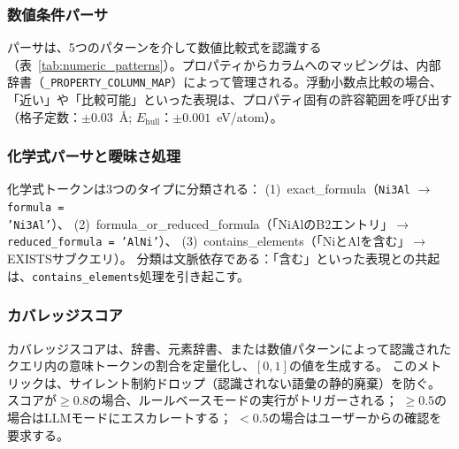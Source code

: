 \documentclass[twocolumn]{interact}
\makeatletter
\def\toprule{\noalign{\ifnum0=`}\fi
  \@aboverulesep=\abovetopsep
  \global\@belowrulesep=\belowrulesep
  \global\@thisruleclass=\@ne
  \@ifnextchar[{\@BTrule}{\@BTrule[\heavyrulewidth]}}
\def\midrule{\noalign{\ifnum0=`}\fi
  \@aboverulesep=\aboverulesep
  \global\@belowrulesep=\belowrulesep
  \global\@thisruleclass=\@ne
  \@ifnextchar[{\@BTrule}{\@BTrule[\lightrulewidth]}}
\def\bottomrule{\noalign{\ifnum0=`}\fi
  \@aboverulesep=\aboverulesep
  \global\@belowrulesep=\belowbottomsep
  \global\@thisruleclass=\@ne
  \@ifnextchar[{\@BTrule}{\@BTrule[\heavyrulewidth]}}
\makeatother
\begin{document}
\subsubsection{数値条件パーサ}

パーサは、5つのパターンを介して数値比較式を認識する（表~\ref{tab:numeric_patterns}）。プロパティからカラムへのマッピングは、内部辞書（\texttt{\_PROPERTY\_COLUMN\_MAP}）によって管理される。浮動小数点比較の場合、「近い」や「比較可能」といった表現は、プロパティ固有の許容範囲を呼び出す（格子定数：$\pm 0.03$~\AA{}{}; $E_\text{hull}$：$\pm 0.001$~eV/atom）。

\begin{table}[htbp]
  \centering
  \caption{数値条件パーサパターン。}
  \label{tab:numeric_patterns}
  \footnotesize
\end{table}

\subsubsection{化学式パーサと曖昧さ処理}

化学式トークンは3つのタイプに分類される：
(1)~exact\_formula（\texttt{Ni3Al} $\to$ \texttt{formula = 'Ni3Al'}）、
(2)~formula\_or\_reduced\_formula（「NiAlのB2エントリ」$\to$ \texttt{reduced\_formula = 'AlNi'}）、
(3)~contains\_elements（「NiとAlを含む」$\to$ EXISTSサブクエリ）。
分類は文脈依存である：「含む」といった表現との共起は、\texttt{contains\_elements}処理を引き起こす。

\subsubsection{カバレッジスコア}

カバレッジスコアは、辞書、元素辞書、または数値パターンによって認識されたクエリ内の意味トークンの割合を定量化し、$[0, 1]$の値を生成する。 このメトリックは、サイレント制約ドロップ（認識されない語彙の静的廃棄）を防ぐ。 スコアが$\geq 0.8$の場合、ルールベースモードの実行がトリガーされる； $\geq 0.5$の場合はLLMモードにエスカレートする； $< 0.5$の場合はユーザーからの確認を要求する。
\end{document}
